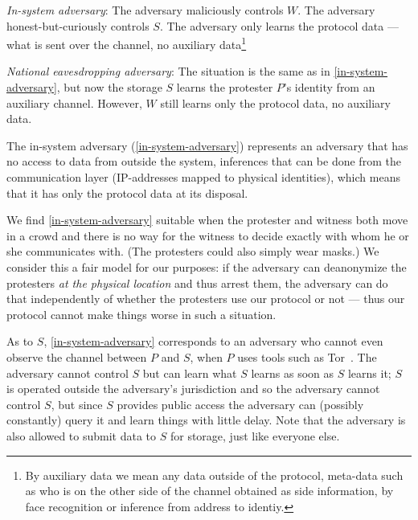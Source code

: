 \begin{adversaries}
\item\label{in-system-adversary}
  \emph{In-system adversary}:
  The adversary maliciously controls \(W\).
  The adversary honest-but-curiously controls \(S\).
  The adversary only learns the protocol data --- \ie what is sent over the 
  channel, no auxiliary data\footnote{%
    By auxiliary data we mean any data outside of the protocol, \ie
    meta-data such as who is on the other side of the channel obtained
    as side information, \eg by face recognition or inference from address
    to identiy.
  }

\item\label{deanonymizing-storage-adversary}
  \emph{National eavesdropping adversary}:
  The situation is the same as in \cref{in-system-adversary}, but now the storage 
  \(S\) learns the protester \(P\)'s identity from an auxiliary channel.
  However, \(W\) still learns only the protocol data, no auxiliary data.

\end{adversaries}

The in-system adversary (\cref{in-system-adversary}) represents an adversary 
that has no access to data from outside the system, \eg inferences that can be 
done from the communication layer (\eg IP-addresses mapped to physical 
identities), which means that it has only the protocol data at its disposal.

We find \cref{in-system-adversary} suitable when the protester and witness both 
move in a crowd and there is no way for the witness to decide exactly with whom 
he or she communicates with.
(The protesters could also simply wear masks.)
We consider this a fair model for our purposes: if the adversary can 
deanonymize the protesters \emph{at the physical location} and thus arrest 
them, the adversary can do that independently of whether the protesters use our 
protocol or not --- thus our protocol cannot make things worse in such a 
situation.

As to \(S\), \cref{in-system-adversary} corresponds to an adversary who cannot 
even observe the channel between \(P\) and \(S\), \eg when \(P\) uses tools 
such as Tor~\cite{Tor}.
The adversary cannot control \(S\) but can learn what \(S\) learns as soon as 
\(S\) learns it; \eg \(S\) is operated outside the adversary's jurisdiction and 
so the adversary cannot control \(S\), but since \(S\) provides public access 
the adversary can (possibly constantly) query it and learn things with little 
delay.
Note that the adversary is also allowed to submit data to \(S\) for storage, 
just like everyone else.

